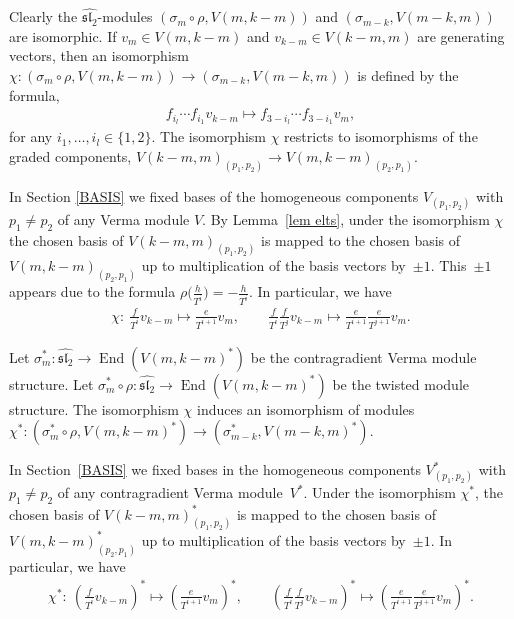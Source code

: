 Clearly the $\widehat{{\mathfrak{sl}_2}}$-modules $(\sigma_m\circ \rho, V(m,k-m))$ and $(\sigma_{m-k}, V(m-k,m))$ are isomorphic. If $v_m\in V(m,k-m)$ and $v_{k-m}\in V(k-m,m)$ are generating vectors, then an isomorphism $\chi\colon (\sigma_m\circ \rho, V(m,k-m)) \to (\sigma_{m-k}, V(m-k,m))$ is defined by the formula,
\begin{gather*}
f_{i_l}\cdots f_{i_1}v_{k-m} \mapsto f_{3-i_l}\cdots f_{3-i_1}v_{m},
\end{gather*}
for any $i_1,\dots,i_l\in\{1,2\}$. The isomorphism $\chi$ restricts to isomorphisms of the graded components, $V(k-m,m)_{(p_1,p_2)} \to V(m,k-m)_{(p_2,p_1)}$.

In Section \ref{BASIS} we fixed bases of the homogeneous components $V_{(p_1,p_2)}$ with $p_1\ne p_2$ of any Verma module $V$. By Lemma~\ref{lem elts}, under the isomorphism $\chi$ the chosen basis of $V(k-m, m)_{(p_1,p_2)}$ is mapped to the chosen basis of $V(m,k-m)_{(p_2,p_1)}$ up to multiplication of the basis vectors by~$\pm 1$. This~$\pm 1$ appears due to the formula $\rho\big(\frac h{T^i}\big) = - \frac h{T^i}$. In particular, we have
\begin{gather*}
\chi \colon \ \frac f{T^i}v_{k-m} \mapsto \frac e{T^{i+1}}v_{m}, \qquad
\frac f{T^i} \frac f{T^j} v_{k-m} \mapsto \frac e{T^{i+1}}\frac e{T^{j+1}}v_{m}.
\end{gather*}

Let $ \sigma^*_m \colon \widehat{{\mathfrak{sl}_2}} \to \operatorname{End}( V(m,k-m)^*)$ be the contragradient Verma module structure. Let $ \sigma^*_m\circ \rho \colon \widehat{{\mathfrak{sl}_2}} \to \operatorname{End}( V(m,k-m)^*)$ be the twisted module structure. The isomorphism $\chi$ induces an isomorphism of modules $\chi^* \colon (\sigma^*_m\circ \rho, V(m,k-m)^*) \to (\sigma^*_{m-k}, V(m-k,m)^*)$.

In Section~\ref{BASIS} we fixed bases in the homogeneous components $V^*_{(p_1,p_2)}$ with $p_1\ne p_2$ of any contragradient Verma module~$V^*$. Under the isomorphism $\chi^*$, the chosen basis of $V(k-m, m)^*_{(p_1,p_2)}$ is mapped to the chosen basis of $V(m,k-m)^*_{(p_2,p_1)}$ up to multiplication of the basis vectors by~$\pm 1$. In particular, we have
\begin{gather*}
 \chi^* \colon \ \left(\frac f{T^i}v_{k-m}\right)^* \mapsto \left(\frac e{T^{i+1}}v_{m}\right)^*, \qquad
\left(\frac f{T^i} \frac f{T^j} v_{k-m}\right)^* \mapsto \left(\frac e{T^{i+1}}\frac e{T^{j+1}}v_{m}\right)^*.
\end{gather*}

